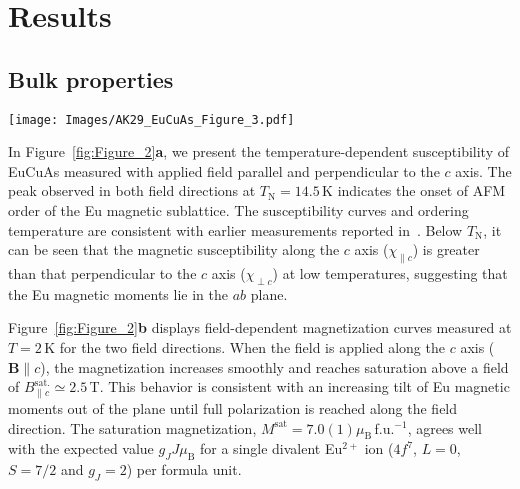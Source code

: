 \documentclass[aps,prl,amsmath,amssymb,amstext,citeautoscript,punctuation,nofootinbib,superscriptaddress,twocolumn]{revtex4-1}
\newcommand{\eca}{EuCuAs}
\begin{document}
\section{Results}
\subsection{Bulk properties}

\begin{figure*}[t!]
\texttt{[image: Images/AK29\_EuCuAs\_Figure\_3.pdf]}
\caption{\label{fig:Figure_3} \textbf{Unravelling the magnetic order of \eca{} with neutrons and x-rays.} \textbf{a} Powder neutron diffraction (PND). Red and blue tick marks indicate structural and magnetic Bragg peaks. \textbf{b} Resonant elastic X-ray scattering (REXS). The peaks at $L = 1.58$ and $2.42$ are magnetic Bragg peaks. \textbf{c} Single-crystal neutron diffraction (ND). The peaks at $L = 0.5$ and $1.5$ are magnetic Bragg peaks. \textbf{d} Integrated intensity of the \textbf{Q}=$(1,0,1.5)$ magnetic reflection measured with ND. \textbf{e} Refinement of single-crystal ND data, comparing the observed and calculated magnetic Bragg peak intensities for the helical structure. \textbf{f} Comparison of observed ($P_{ij}^\mathrm{obs.}$) and calculated ($P_{ij}^\mathrm{helix}$) full polarization matrices for four magnetic reflections. For each reflection, the nine elements of the polarization matrix $P_{ij}$ from left to right correspond to $ij$ = $xx$, $xy$, $xz$, $yx$, $yy$, $yz$, $zx$, $zy$ and $zz$. The data were recorded at $T = 2$\,K. \textbf{g}, \textbf{h} Field dependence of peaks observed with REXS and ND, respectively.}
\end{figure*}
 
In Figure~\ref{fig:Figure_2}\textbf{a}, we present the temperature-dependent susceptibility of \eca{} measured with applied field parallel and perpendicular to the $c$ axis. The peak observed in both field directions at $T_\mathrm{N}=14.5$\,K indicates the onset of AFM order of the Eu magnetic sublattice. The susceptibility curves and ordering temperature are consistent with earlier measurements reported in~\cite{tong2014magnetic}. Below $T_\mathrm{N}$, it can be seen that the magnetic susceptibility along the $c$ axis ($\chi_{\|c}$) is  greater than that perpendicular to the $c$ axis ($\chi_{\perp c}$) at low temperatures, suggesting that the Eu magnetic moments lie in the $ab$ plane.  

Figure~\ref{fig:Figure_2}\textbf{b} displays field-dependent magnetization curves measured at $T=2$\,K for the two field directions. When the field is applied along the $c$ axis ($\textbf{B}\|c$), the magnetization increases smoothly and reaches saturation above a field of $B_{\|c}^\mathrm{sat.}\simeq 2.5$\,T. This behavior is consistent with an increasing tilt of Eu magnetic moments out of the plane until full polarization is reached along the field direction. The saturation magnetization, $M^\mathrm{sat} = 7.0(1) \mu_\mathrm{B}$\,f.u.$^{-1}$, agrees well with the expected value  $g_J J\mu_\textrm{B}$ for a single divalent Eu$^{2+}$ ion ($4f^7$, $L=0$, $S=7/2$ and $g_J=2$) per formula unit.
\end{document}
